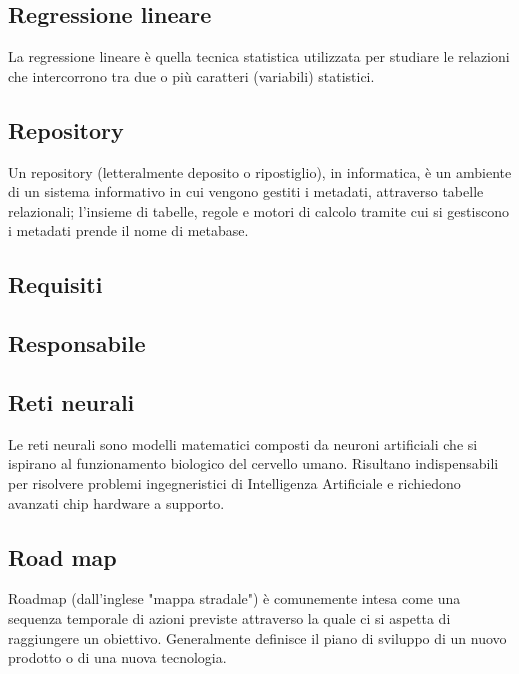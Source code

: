 
\subsection*{Regressione lineare}
La regressione lineare è quella tecnica statistica utilizzata per studiare le relazioni che intercorrono tra due o più caratteri (variabili) statistici.

\subsection*{Repository}
Un repository (letteralmente deposito o ripostiglio), in informatica, è un ambiente di un sistema informativo  in cui vengono gestiti i metadati, attraverso tabelle relazionali; l'insieme di tabelle, regole e motori di calcolo tramite cui si gestiscono i metadati prende il nome di metabase.

\subsection*{Requisiti}

\subsection*{Responsabile}

\subsection*{Reti neurali}
Le reti neurali sono modelli matematici composti da neuroni artificiali che si ispirano al funzionamento biologico del cervello umano. 
Risultano indispensabili per risolvere problemi ingegneristici di Intelligenza Artificiale e richiedono avanzati chip hardware a supporto.

\subsection*{Road map}
Roadmap (dall'inglese "mappa stradale") è comunemente intesa come una sequenza temporale di azioni previste attraverso la quale ci si aspetta di raggiungere un obiettivo. Generalmente definisce il piano di sviluppo di un nuovo prodotto o di una nuova tecnologia.

